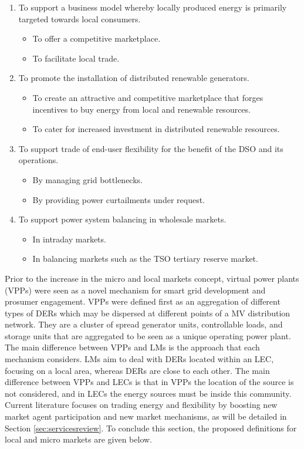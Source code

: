 \begin{enumerate}
\item To support a business model whereby locally produced energy is primarily targeted towards local
consumers.
\begin{itemize}
\item To offer a competitive marketplace.
\item To facilitate local trade.
\end{itemize}
\item To promote the installation of distributed renewable generators.
\begin{itemize}
\item To create an attractive and competitive marketplace that forges incentives to buy energy from local
and renewable resources.
\item To cater for increased investment in distributed renewable resources.
\end{itemize}
\item To support trade of end-user flexibility for the benefit of the DSO and its operations.
\begin{itemize}
\item By managing grid bottlenecks.
\item By providing power curtailments under request.
\end{itemize}
\item To support power system balancing in wholesale markets.
\begin{itemize}
\item In intraday markets.
\item In balancing markets such as the TSO tertiary reserve market.
\end{itemize}
\end{enumerate}

\vspace{-2mm}

Prior to the increase in the micro and local markets concept, virtual power plants (VPPs) were seen as a novel mechanism for smart grid development and prosumer engagement. VPPs were defined first as an aggregation of different types of DERs which may be dispersed at different points of a MV distribution network. They are a cluster of spread generator units, controllable loads, and storage units that are aggregated to be seen as a unique operating power plant. The main difference between VPPs and LMs is the approach that each mechanism considers. LMs aim to deal with DERs located within an LEC, focusing on a local area, whereas DERs are close to each other. The main difference between VPPs and LECs is that in VPPs the location of the source is not considered, and in LECs the energy sources must be inside this community. Current literature focuses on trading energy and flexibility by boosting new market agent participation and new market mechanisms, as will be detailed in Section \ref{sec:servicesreview}. To conclude this section, the proposed definitions for local and micro markets are given below.
\vspace{1mm}

